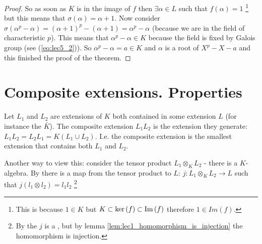\begin{theorem}
\begin{proof}
    So as soon as $K$ is in the image of $f$ then $\exists \alpha \in L$
    such that $f\left(\alpha\right) = 1$
    \footnote{
      This is because $1 \in K$ but
      $K \subset \ker\left(f\right) \subset \operatorname{Im}\left(f\right)$ therefore
      $1 \in Im\left(f\right)$.
    }
    but this means that
    $\sigma\left(\alpha\right) = \alpha + 1$. Now consider
    $\sigma\left(\alpha^p - \alpha\right) =
    \left(\alpha + 1\right)^p - \left(\alpha + 1\right) = \alpha^p -
    \alpha$ (because we are in the field of characteristic $p$). This
    means that $\alpha^p - \alpha \in K$ because the field is fixed by
    Galois group (see (\ref{eq:lec5_2})). So
    $\alpha^p - \alpha =  a \in K$ and $\alpha$ is a root of $X^p - X
    - a$ and this finished the proof of the theorem.
  \end{proof}
  \label{thm:lec7_1}
\end{theorem}

\section{Composite extensions. Properties}

\begin{definition}
  Let $L_1$ and $L_2$ are extensions of $K$ both contained in some
  extension $L$ (for instance the 
  $\bar{K}$). The composite extension $L_1 L_2$ is the extension they
  generate: $L_1 L_2 = L_2 L_1 = K\left(L_1 \cup L_2\right)$. I.e. the
  composite extension is the smallest extension that contains both
  $L_1$ and $L_2$.
  \label{def:compositeextension}
\end{definition}

Another way to view this: consider the tensor product $L_1 \otimes_K
L_2$ - there is a $K$-algebra. By 
there is a map from the tensor product to $L$:
\(
j: L_1 \otimes_K L_2 \to L  
\)
such that $j\left(l_1 \otimes l_2\right) = l_1 l_2$
\footnote{
  By the  $j$ is a 
  , but by lemma
  \ref{lem:lec1_homomorphism_is_injection} the homomorphism is
  injection.
}



